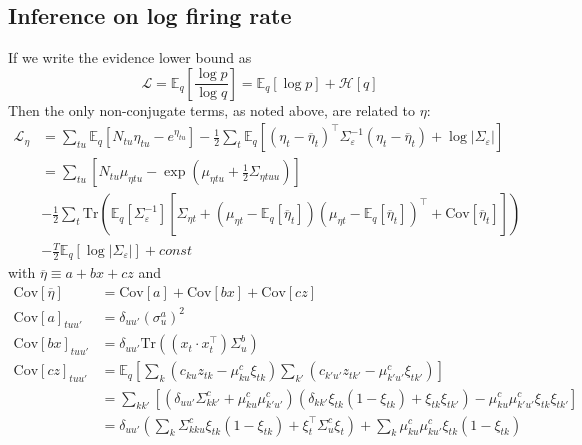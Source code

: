 \documentclass[11pt]{article}
\begin{document}
\subsection{Inference on log firing rate}
If we write the evidence lower bound as
\begin{equation}
    \mathcal{L} = \mathbb{E}_q \left[ \frac{\log p}{\log q}\right] =
    \mathbb{E}_q[\log p] + \mathcal{H}[q]
\end{equation}
Then the only non-conjugate terms, as noted above, are related to $\eta$:
\begin{align}
    \mathcal{L}_\eta &=
    \sum_{tu} \mathbb{E}_q[N_{tu} \eta_{tu} - e^{\eta_{tu}}]
    - \frac{1}{2} \sum_{t} \mathbb{E}_q \left[
    (\eta_t - \overline{\eta}_t)^\top \Sigma_\varepsilon^{-1}(\eta_t - \overline{\eta}_t)
    + \log |\Sigma_\varepsilon| \right]\\
    \label{eta_opt}
    &= \sum_{tu} \left[ N_{tu} \mu_{\eta tu} -
    \exp\left(\mu_{\eta tu} + \frac{1}{2} \Sigma_{\eta tuu} \right)\right] \\
    \nonumber
    &- \frac{1}{2} \sum_{t} \mathrm{Tr}\left(
    \mathbb{E}_q[\Sigma_\varepsilon^{-1}]
    \left[ \Sigma_{\eta t} + (\mu_{\eta t} - \mathbb{E}_q[\overline{\eta}_{t}])
    (\mu_{\eta t} - \mathbb{E}_q[\overline{\eta}_{t}])^\top
    + \mathrm{Cov}[\overline{\eta}_{t}]\right] \right) \\ \nonumber
    &- \frac{T}{2} \mathbb{E}_q[\log |\Sigma_\varepsilon|] + const
\end{align}
with $\overline{\eta} \equiv a + bx + cz$ and
\begin{align}
    \mathrm{Cov}[\overline{\eta}] &= \mathrm{Cov}[a] + \mathrm{Cov}[bx] + \mathrm{Cov}[cz] \\
    \mathrm{Cov}[a]_{tuu'} &= \delta_{uu'}(\sigma^a_u)^2 \\
    \mathrm{Cov}[bx]_{tuu'} &= \delta_{uu'}\mathrm{Tr}\left((x_t\cdot x_t^\top) \Sigma^b_{u}\right) \\
    \mathrm{Cov}[cz]_{tuu'} &= \mathbb{E}_q\left[\sum_{k}\left( c_{ku} z_{tk} - \mu^c_{ku}\xi_{tk} \right)\sum_{k'}\left( c_{k'u'} z_{tk'} - \mu^c_{k'u'}\xi_{tk'} \right)\right] \\
    &= \sum_{kk'}\left[\left(\delta_{uu'}\Sigma^c_{kk'} + \mu^c_{ku} \mu^c_{k'u'} \right)\left(\delta_{kk'}\xi_{tk}(1 - \xi_{tk}) + \xi_{tk}\xi_{tk'}\right) - \mu^c_{ku}\mu^c_{k'u'}\xi_{tk}\xi_{tk'} \right] \\
    &= \delta_{uu'}\left(\sum_k \Sigma^c_{kku} \xi_{tk} (1 - \xi_{tk}) + \xi_t^\top \Sigma_u^c \xi_t\right) + \sum_k \mu^c_{ku}\mu^c_{ku'}\xi_{tk}(1 - \xi_{tk})
\end{align}
\end{document}
